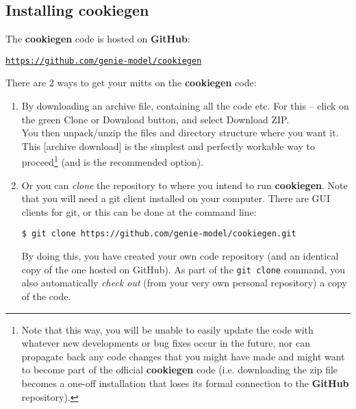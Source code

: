 
\subsection{Installing cookiegen}

The \textbf{cookiegen} code is hosted on \textbf{GitHub}:

\vspace{2mm}
\href{https://github.com/genie-model/cookiegen}{\texttt{https://github.com/genie-model/cookiegen}}
\vspace{2mm}

There are 2 ways to get your mitts on the \textbf{cookiegen} code:

\vspace{2mm}
\begin{enumerate}

\vspace{1mm}
\item By downloading an archive file, containing all the code etc. For this -- click on the \textcolor[rgb]{0,0.501961,0}{green} \textsf{\small{Clone or Download}} button, and select \textsf{\small{Download ZIP}}.
\\You then unpack/unzip the files and directory structure where you want it.
\\This [archive download] is the simplest and  perfectly workable way to proceed\footnote{Note that this way, you will be unable to easily update the code with whatever new developments or bug fixes occur in the future, nor can propagate back any code changes that you might have made and might want to become part of the official \textbf{cookiegen} code  (i.e. downloading the \textsf{zip} file becomes a one-off installation that loses its formal connection to the \textbf{GitHub} repository).} (and is the recommended option).

\vspace{1mm}
\item Or you can \textit{clone} the repository to where you intend to run \textbf{cookiegen}. Note that you will need a git client installed on your computer. There are GUI clients for git, or this can be done at the command line:

\vspace{-2mm}
\begin{verbatim}
$ git clone https://github.com/genie-model/cookiegen.git
\end{verbatim}
\vspace{-2mm}

By doing this, you have created your own code repository (and an identical copy of the one hosted on GitHub). As part of the \texttt{git clone} command, you also automatically \textit{check out} (from your very own personal repository) a copy of the code.

\end{enumerate}
\vspace{2mm}

